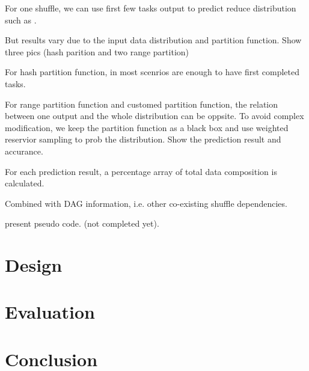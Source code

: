 \documentclass[10pt,twocolumn]{article}
\begin{document}
For one shuffle, we can use first few tasks output to predict reduce distribution such as \cite{ishuffle}. 

But results vary due to the input data distribution and partition function. Show three pics (hash parition and two range partition)

For hash partition function, in most scenrios are enough to have first completed tasks.

For range partition function and customed partition function, the relation between one output and the whole distribution can be oppsite.
To avoid complex modification, we keep the partition function as a black box and use weighted reservior sampling to prob the distribution.
Show the prediction result and accurance.

For each prediction result, a percentage array of total data composition is calculated.

Combined with DAG information, i.e. other co-existing shuffle dependencies.

present pseudo code. (not completed yet).

\section{Design}\label{design}
\section{Evaluation}

\section{Conclusion}





\end{document}
